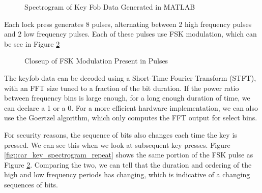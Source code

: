 \documentclass{article}
\begin{document}
\begin{figure}[H]
	\centerline{}
	\caption{Spectrogram of Key Fob Data Generated in MATLAB}
	\label{fig::car_key_spectrogram}
\end{figure}

Each lock press generates 8 pulses, alternating between 2 high frequency pulses and 2 low frequency pulses. Each of these pulses use FSK modulation, which can be see in Figure \ref{fig::car_key_spectrogram_focus}

\begin{figure}[H]
	\centerline{}
	\caption{Closeup of FSK Modulation Present in Pulses}
	\label{fig::car_key_spectrogram_focus}
\end{figure}

The keyfob data can be decoded using a Short-Time Fourier Transform (STFT), with an FFT size tuned to a fraction of the bit duration. If the power ratio between frequency bins is large enough, for a long enough duration of time, we can declare a 1 or a 0. For a more efficient hardware implementation, we can also use the Goertzel algorithm, which only computes the FFT output for select bins. 

For security reasons, the sequence of bits also changes each time the key is pressed. We can see this when we look at subsequent key presses. Figure \ref{fig::car_key_spectrogram_repeat} shows the same portion of the FSK pulse as Figure \ref{fig::car_key_spectrogram_focus}. Comparing the two, we can tell that the duration and ordering of the high and low frequency periods has changing, which is indicative of a changing sequences of bits.
\end{document}
